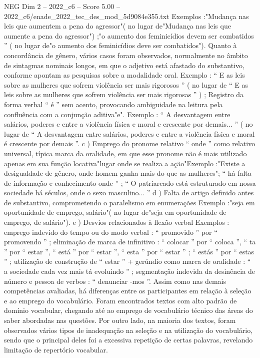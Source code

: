\begin{textsample}{NEG Dim 2 – 2022\_c6 – Score 5.00 – 2022\_c6/enade\_2022\_tec\_des\_mod\_5d9084e355.txt}
Exemplos :"Mudança nas leis que aumentem a pena do agressor"( no lugar de"Mudança nas leis que aumente a pena do agressor") ;"o aumento dos feminicídios devem ser combatidos ” ( no lugar de"o aumento dos feminicídios deve ser combatidos").
Quanto à concordância de gênero, vários casos foram observados, normalmente no âmbito de sintagmas nominais longos, em que o adjetivo está afastado do substantivo, conforme apontam as pesquisas sobre a modalidade oral.
Exemplo : “ E as leis sobre as mulheres que sofrem violência ser mais rigorosos ” ( no lugar de “ E as leis sobre as mulheres que sofrem violência ser mais rigorosas ” ) ; Registro da forma verbal “ é ” sem acento, provocando ambiguidade na leitura pela confluência com a conjunção aditiva"e".
Exemplo : “ A desvantagem entre salários, poderes e entre a violência física e moral e crescente por demais... ” ( no lugar de “ A desvantagem entre salários, poderes e entre a violência física e moral é crescente por demais ”. c ) Emprego do pronome relativo “ onde ” como relativo universal, típica marca da oralidade, em que esse pronome não é mais utilizado apenas em sua função locativa"lugar onde se realiza a ação"Exemplo :"Existe a desigualdade de gênero, onde homem ganha mais do que as mulheres"; “ há falta de informação e conhecimento onde ” ; “ O patriarcado está estruturado em nossa sociedade há séculos, onde o sexo masculino... ” d ) Falta de artigo definido antes de substantivo, comprometendo o paralelismo em enumerações Exemplo :"seja em oportunidade de emprego, salário"( no lugar de"seja em oportunidade de emprego, de salário"). e ) Desvios relacionados à flexão verbal Exemplos : emprego indevido do tempo ou do modo verbal : “ promovido ” por “ promovendo ” ; eliminação de marca de infinitivo : “ colocar ” por “ coloca ”, “ ta ” por “ estar ”, “ está ” por “ estar ”, “ esta ” por “ estar ” ; “ estás ” por “ estas ” ; utilização de construção de “ estar ” + gerúndio como marca de oralidade : “ a sociedade cada vez mais tá evoluindo ” ; segmentação indevida da desinência de número e pessoa de verbos : “ denunciar -mos ”.
Assim como nas demais competências avaliadas, há diferenças entre os participantes em relação à seleção e ao emprego do vocabulário.
Foram encontrados textos com alto padrão de domínio vocabular, chegando até ao emprego de vocabulário técnico das áreas do saber abordadas nas questões.
Por outro lado, na maioria dos textos, foram observados vários tipos de inadequação na seleção e na utilização do vocabulário, sendo que o principal deles foi a excessiva repetição de certas palavras, revelando limitação de repertório vocabular.

\end{textsample}
